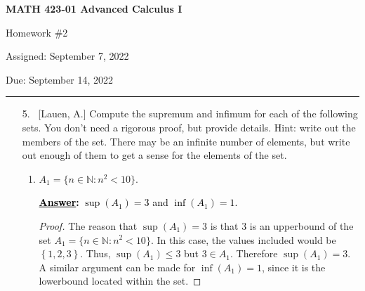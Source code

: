 \documentclass[10pt]{article}
\begin{document}
\pagestyle{empty}  %

\begin{center}  %

{\bf MATH 423-01  Advanced Calculus I

Homework \#2

Assigned: September 7, 2022

Due: September 14, 2022}

\end{center}

\medskip

\hrule   %

\bigskip


\begin{enumerate}

\item[5.] ~[Lauen, A.] Compute the supremum and infimum for each of the following sets.  You don't need a rigorous proof, but provide details.  Hint: write out the members of the set.  There may be an infinite number of elements, but write out enough of them to get a sense for the elements of the set.

	\begin{enumerate}
\item  $A_1 = \{n \in \mathbb{N}: n^2 < 10\}$.
  \par \medskip
	\textbf{\textcolor{black}{\underline{Answer}:}}
\textcolor{black}{$\sup{(A_1)}=3$ and $\inf{(A_1)} = 1$.}
\begin{proof}
  The reason that $\sup{(A_1)}=3$ is that 3 is an upperbound of the set $A_1 = \{n \in \mathbb{N}: n^2 < 10\}$.  In this case, the values included would be $\left\{1,2,3\right\}$.  Thus, $\sup{(A_1)} \leq 3$ but $3 \in A_1$.  Therefore $\sup{(A_1)}=3$.  A similar argument can be made for $\inf{(A_1)} = 1$, since it is the lowerbound located within the set.  
\end{proof}  


\end{enumerate}
\end{enumerate}
\end{document}
